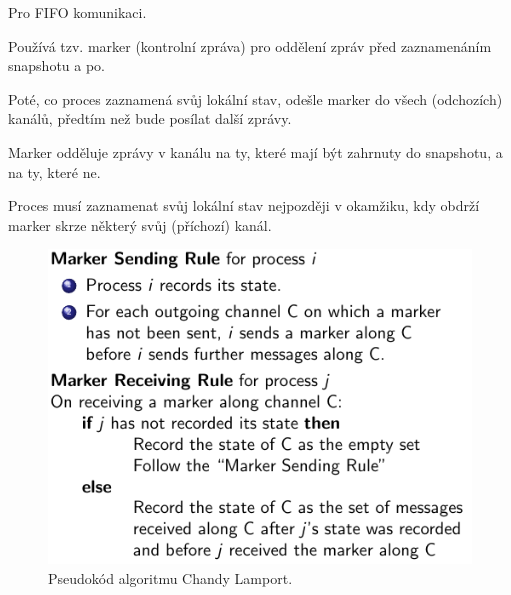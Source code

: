 \begin{compactitem}
    \item Pro FIFO komunikaci.

    \item Používá tzv. marker (kontrolní zpráva) pro oddělení zpráv před zaznamenáním snapshotu a po. \begin{compactitem}

        \item Poté, co proces zaznamená svůj lokální stav, odešle marker do všech (odchozích) kanálů, předtím než bude posílat další zprávy.

        \item Marker odděluje zprávy v kanálu na ty, které mají být zahrnuty do snapshotu, a na ty, které ne.

        \item Proces musí zaznamenat svůj lokální stav nejpozději v okamžiku, kdy obdrží marker skrze některý svůj (příchozí) kanál.
    \end{compactitem}





    \begin{figure}[H]
        \centering
        \includegraphics[width=0.6\linewidth]{chandy_lamport_alg.pdf}
        \caption{Pseudokód algoritmu Chandy Lamport.}
    \end{figure}


\end{compactitem}
